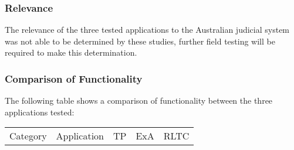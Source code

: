 \documentclass{article}
\begin{document}
\subsubsection{Relevance}
The relevance of the three tested applications to the Australian judicial system was not able to be determined by these studies, further field testing will be required to make this determination.
\subsubsection{Comparison of Functionality}
The following table shows a comparison of functionality between the three applications tested: %
\singlespace
\begin{center}
\begin{tabular}{|c| c|| c| c| c |} 
\hline
 Category & Application & TP & ExA & RLTC \\ [0.5ex] 


\end{tabular}
\end{center}
\end{document}
